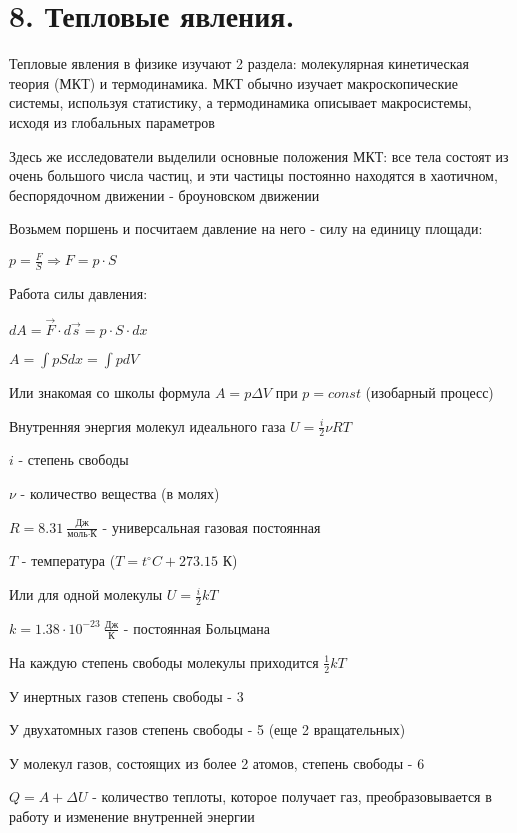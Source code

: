 \documentclass[12pt]{article}
\begin{document}
    \section{8. Тепловые явления.}

    Тепловые явления в физике изучают 2 раздела: молекулярная кинетическая теория (МКТ) и термодинамика. 
    МКТ обычно изучает макроскопические системы, используя статистику, а термодинамика описывает
    макросистемы, исходя из глобальных параметров

    Здесь же исследователи выделили основные положения МКТ: все тела состоят из очень большого числа частиц, 
    и эти частицы постоянно находятся в хаотичном, беспорядочном движении - броуновском движении

    Возьмем поршень и посчитаем давление на него - силу на единицу площади:

    $p = \frac{F}{S} \Longrightarrow F = p \cdot S$

    Работа силы давления:

    $dA = \vec{F} \cdot d\vec{s} = p \cdot S \cdot dx$

    $A = \int pS dx = \int p dV$

    Или знакомая со школы формула $A = p\Delta V$ при $p = const$ (изобарный процесс)

    Внутренняя энергия молекул идеального газа $U = \frac{i}{2} \nu R T$

    $i$ - степень свободы

    $\nu$ - количество вещества (в молях)

    $R = 8.31\ \frac{\text{Дж}}{\text{моль} \cdot \text{К}}$ - универсальная газовая постоянная

    $T$ - температура ($T = t^\circ C + 273.15$ К)

    Или для одной молекулы $U = \frac{i}{2} kT$

    $k = 1.38 \cdot 10^{-23}\ \frac{\text{Дж}}{\text{К}}$ - постоянная Больцмана

    На каждую степень свободы молекулы приходится $\frac{1}{2}kT$

    У инертных газов степень свободы - 3

    У двухатомных газов степень свободы - 5 (еще 2 вращательных)

    У молекул газов, состоящих из более 2 атомов, степень свободы - 6

    $Q = A + \Delta U$ - количество теплоты, которое получает газ, преобразовывается в работу и изменение внутренней энергии
\end{document}
